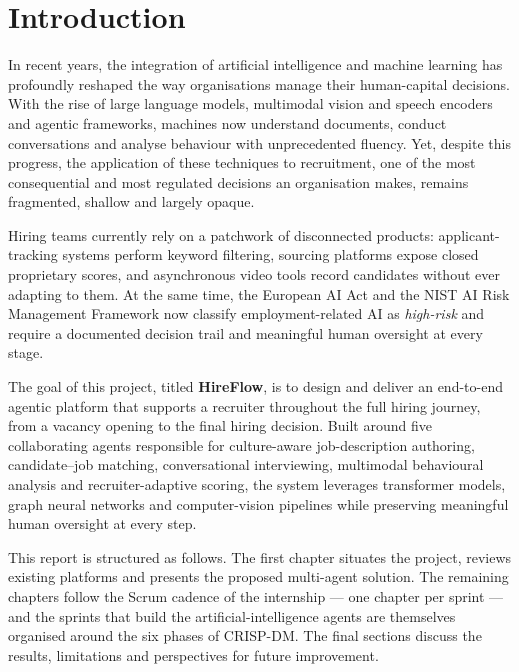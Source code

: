 \chapter*{Introduction}
\label{chap:introduction}

\noindent In recent years, the integration of artificial intelligence and
machine learning has profoundly reshaped the way organisations manage
their human-capital decisions. With the rise of large language models,
multimodal vision and speech encoders and agentic frameworks, machines now
understand documents, conduct conversations and analyse behaviour with
unprecedented fluency. Yet, despite this progress, the application of
these techniques to recruitment, one of the most consequential and most
regulated decisions an organisation makes, remains fragmented, shallow
and largely opaque.

\vspace{0.3cm}

\noindent Hiring teams currently rely on a patchwork of disconnected
products: applicant-tracking systems perform keyword filtering, sourcing
platforms expose closed proprietary scores, and asynchronous video tools
record candidates without ever adapting to them. At the same time, the
European AI Act and the NIST AI Risk Management Framework now classify
employment-related AI as \emph{high-risk} and require a documented
decision trail and meaningful human oversight at every stage.

\vspace{0.3cm}

\noindent The goal of this project, titled \textbf{HireFlow}, is to design
and deliver an end-to-end agentic platform that supports a recruiter
throughout the full hiring journey, from a vacancy opening to the final
hiring decision. Built around five collaborating agents responsible for
culture-aware job-description authoring, candidate--job matching,
conversational interviewing, multimodal behavioural analysis and
recruiter-adaptive scoring, the system leverages transformer models,
graph neural networks and computer-vision pipelines while preserving
meaningful human oversight at every step.

\vspace{0.3cm}

\noindent This report is structured as follows. The first chapter
situates the project, reviews existing platforms and presents the
proposed multi-agent solution. The remaining chapters follow the Scrum
cadence of the internship --- one chapter per sprint --- and the sprints
that build the artificial-intelligence agents are themselves organised
around the six phases of CRISP-DM. The final sections discuss the
results, limitations and perspectives for future improvement.

